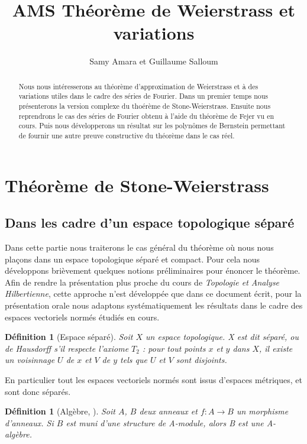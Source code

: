 \documentclass{amsart}
\title{AMS Théorème de Weierstrass et variations}
\author{Samy Amara et Guillaume Salloum}
\newtheorem{definition}[subsubsection]{Définition}
\begin{document}
\begin{abstract}
	Nous nous intéresserons au théorème d'approximation de Weierstrass et
	à des variations utiles dans le cadre des séries de Fourier. 
	Dans un premier temps nous présenterons la version complexe 
	du thoérème de Stone-Weierstrass.
	Ensuite nous reprendrons le cas
	des séries de Fourier obtenu à l'aide du théorème de Fejer vu en cours. 
	Puis nous développerons un résultat sur les polynômes de Bernstein permettant
	de fournir une autre preuve constructive du théorème dans le cas réel.
\end{abstract}

\maketitle
\setcounter{tocdepth}{2}
\tableofcontents

\section{Théorème de Stone-Weierstrass}
\subsection{Dans les cadre d'un espace topologique séparé}

\par Dans cette partie nous traiterons le cas général du théorème où nous nous plaçons dans 
un espace topologique séparé et compact. Pour cela nous développons brièvement quelques notions préliminaires pour énoncer le théorème.
Afin de rendre la présentation plus proche du cours de \textit{Topologie et Analyse Hilbertienne}, cette approche n'est développée que dans ce document écrit, pour la présentation orale nous adaptons systématiquement les résultats dans le cadre des espaces vectoriels normés étudiés en cours.

\begin{definition}[Espace séparé]
	Soit \( X \) un espace topologique. X est dit \textit{séparé}, ou \textit{de Hausdorff} s'il respecte l'axiome \( T_{2} \) : pour tout points \( x \) et \( y \) dans \( X \), il existe un voisinnage \( U \) de \( x \) et \( V \) de \( y \) tels que \( U \) et \( V \) sont disjoints.
\end{definition}

En particulier tout les espaces vectoriels normés sont issus d'espaces métriques, et sont donc séparés.

\begin{definition}[Algèbre, \cite{atiyah1969introduction}]
	Soit \( A \), \( B \) deux anneaux et \( f : A \rightarrow B \) 
	un morphisme d'anneaux. Si \( B \) est muni d'une structure de \textit{A-module}, alors B est une \textit{A-algèbre}.
\end{definition}
\end{document}
